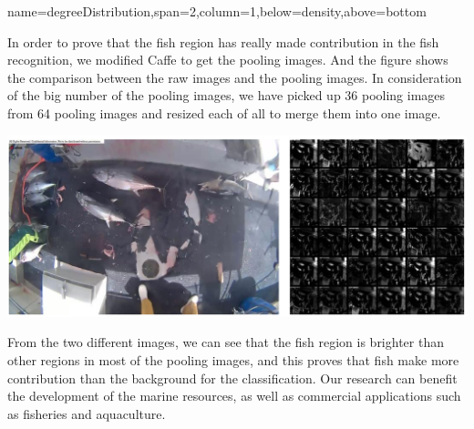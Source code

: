 \documentclass[a0paper,portrait]{baposter}
\begin{document}
\begin{poster}
{name=degreeDistribution,span=2,column=1,below=density,above=bottom}{

\quad In order to prove that the fish region has really made contribution in the fish recognition, we modified Caffe\cite{jia2014caffe} to get the pooling images. And the figure shows the comparison between the raw images and the pooling images. In consideration of the big number of the pooling images, we have picked up 36 pooling images from 64 pooling images and resized each of all to merge them into one image.
\vspace{-0.2em}
\begin{center}
	\includegraphics[width=\linewidth]{merge}
\end{center}
\vspace{-0.2em}
\quad From the two different images, we can see that the fish region is brighter than other regions in most of the pooling images, and this proves that fish make more contribution than the background for the classification. Our research can benefit the development of the marine resources, as well as commercial applications such as fisheries and aquaculture.
}

\end{poster}
\end{document}
